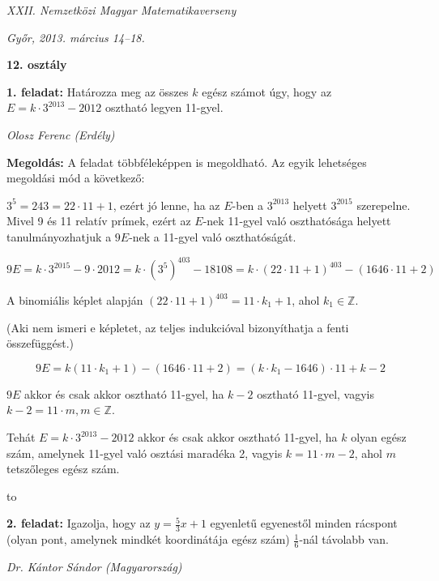 \documentclass[a4paper,10pt]{article}
\newcommand{\ki}[2]{\hfill {\it #1 (#2)}\medskip}
\newcommand{\vonal}{\hbox to \hsize{\hskip2truecm\hrulefill\hskip2truecm}}
\begin{document}
\begin{center} \Large {\em XXII. Nemzetközi Magyar Matematikaverseny} \end{center}
\begin{center} \large{\em Győr, 2013. március 14--18.} \end{center}
\smallskip
\begin{center} \large{\bf 12. osztály} \end{center}
\bigskip

{\bf 1. feladat: } Határozza meg az összes $k$ egész számot úgy, hogy az $E = k\cdot 3^{2013}-2012$ osztható legyen 11-gyel.


\ki{Olosz Ferenc}{Erdély}\medskip

{\bf Megoldás: } A feladat többféleképpen is megoldható. Az egyik lehetséges megoldási mód a következő:

$3^5=243=22\cdot 11+1$, ezért jó lenne, ha az $E$-ben a $3^{2013}$ helyett $3^{2015}$
szerepelne. Mivel 9 és 11 relatív prímek, ezért az $E$-nek 11-gyel való oszthatósága
helyett tanulmányozhatjuk a $9E$-nek a 11-gyel való oszthatóságát. 

$$9E=k\cdot 3^{2015}-9\cdot 2012=
k\cdot \left(3^5\right)^{403}-
18108=
k\cdot\left( 22\cdot 11+ 1\right)^{403}-
(1646\cdot 11+2)$$

A binomiális képlet alapján
$\left(22\cdot 11+1\right)^{403}=11\cdot k_1+1$, ahol
$k_1\in \mathbb{Z}$.

(Aki nem ismeri e képletet, az teljes indukcióval bizonyíthatja a fenti
összefüggést.)

$$9E=k(11\cdot k_1+1)-
(1646\cdot 11+2)=
(k\cdot k_1-1646)\cdot 11+k-2$$

$9E$ akkor és csak akkor osztható 11-gyel, ha $k-2$ osztható 11-gyel, vagyis
$k-2=11\cdot m, m\in \mathbb{Z}$. 

Tehát $E = k \cdot  3^{2013}-2012$ akkor és csak akkor osztható 11-gyel, ha $k$ olyan
egész szám, amelynek 11-gyel való osztási maradéka 2, vagyis $k = 11 \cdot m-2$,
ahol $m$ tetszőleges egész szám.

\medskip

\vonal

\smallskip

{\bf 2. feladat: } Igazolja, hogy az
$\displaystyle{y=\frac{5}{3}x+1}$
 egyenletű egyenestől minden rácspont (olyan pont, amelynek mindkét koordinátája egész szám) 
 $\displaystyle{\frac{1}{6}}$-nál távolabb van.


\ki{Dr. Kántor Sándor}{Magyarország}\medskip
\end{document}
